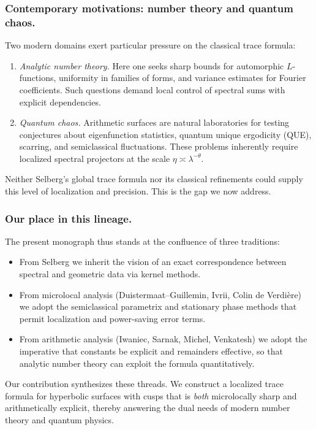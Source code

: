 \subsubsection*{Contemporary motivations: number theory and quantum chaos.}
Two modern domains exert particular pressure on the classical trace formula:

\begin{enumerate}[label=(\alph*)]
  \item \emph{Analytic number theory.} Here one seeks sharp bounds for
  automorphic $L$-functions, uniformity in families of forms, and variance
  estimates for Fourier coefficients. Such questions demand local control of
  spectral sums with explicit dependencies.

  \item \emph{Quantum chaos.} Arithmetic surfaces are natural laboratories for
  testing conjectures about eigenfunction statistics, quantum unique ergodicity
  (QUE), scarring, and semiclassical fluctuations. These problems inherently
  require localized spectral projectors at the scale $\eta\asymp\lambda^{-\theta}$.
\end{enumerate}

Neither Selberg’s global trace formula nor its classical refinements could
supply this level of localization and precision. This is the gap we now address.

\subsubsection*{Our place in this lineage.}
The present monograph thus stands at the confluence of three traditions:

\begin{itemize}
  \item From Selberg we inherit the vision of an exact correspondence between
  spectral and geometric data via kernel methods.
  \item From microlocal analysis (Duistermaat–Guillemin, Ivrii, Colin de
  Verdière) we adopt the semiclassical parametrix and stationary phase methods
  that permit localization and power-saving error terms.
  \item From arithmetic analysis (Iwaniec, Sarnak, Michel, Venkatesh) we adopt
  the imperative that constants be explicit and remainders effective, so that
  analytic number theory can exploit the formula quantitatively.
\end{itemize}

Our contribution synthesizes these threads. We construct a localized trace
formula for hyperbolic surfaces with cusps that is \emph{both} microlocally
sharp and arithmetically explicit, thereby answering the dual needs of modern
number theory and quantum physics.

